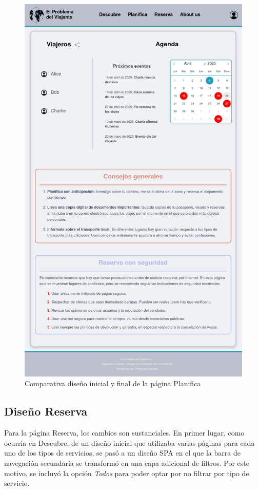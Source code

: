 \documentclass[11pt, a4paper]{book}
\begin{document}
\begin{figure} [H]
\begin{minipage}[c]{0.45\textwidth}
			\includegraphics[width=\textwidth]{full-3.png}
		\end{minipage}
		\caption{Comparativa diseño inicial y final de la página Planifica}
	\end{figure}

    \subsection{Diseño Reserva}
    
    Para la página Reserva, los cambios son sustanciales. En primer lugar, como ocurría en Descubre, de un diseño inicial que utilizaba varias páginas para cada uno de los tipos de servicios, se pasó a un diseño SPA en el que la barra de navegación secundaria se transformó en una capa adicional de filtros. Por este motivo, se incluyó la opción \textit{Todos} para poder optar por no filtrar por tipo de servicio. 
\end{document}
